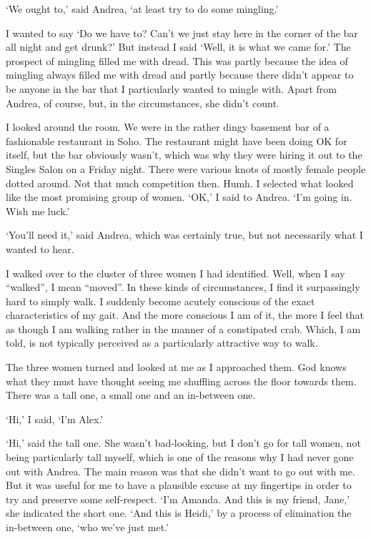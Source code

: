 
\twelverm
`We ought to,' said Andrea, `at least try to do some mingling.'

I wanted to say `Do we have to? Can't we just stay here in the
corner of the bar all night and get drunk?' But instead I said
`Well, it is what we came for.' The prospect of mingling filled me
with dread. This was partly because the idea of mingling always
filled me with dread and partly because there didn't appear to be
anyone in the bar that I particularly wanted to mingle with. Apart
from Andrea, of course, but, in the circumstances, she didn't count.

I looked around the room. We were in the rather dingy basement bar
of a fashionable restaurant in Soho. The restaurant might have been
doing OK for itself, but the bar obviously wasn't, which was why
they were hiring it out to the Singles Salon on a Friday night.
There were various knots of mostly female people dotted around. Not
that much competition then. Humh. I selected what looked like the
most promising group of women. `OK,' I said to Andrea. `I'm going
in. Wish me luck.'

`You'll need it,' said Andrea, which was certainly true, but not
necessarily what I wanted to hear.

I walked over to the cluster of three women I had identified. Well,
when I say ``walked'', I mean ``moved''. In these kinds of
circumstances, I find it surpassingly hard to simply {\twelveit
walk\/}. I suddenly become acutely conscious of the exact
characteristics of my gait. And the more conscious I am of it, the
more I feel that as though I am walking rather in the manner of a
constipated crab. Which, I am told, is not typically perceived as a
particularly attractive way to walk.

The three women turned and looked at me as I approached them. God
knows what they must have thought seeing me shuffling across the
floor towards them. There was a tall one, a small one and an
in-between one.

`Hi,' I said, `I'm Alex.'

`Hi,' said the tall one. She wasn't bad-looking, but I don't go for
tall women, not being particularly tall myself, which is one of the
reasons why I had never gone out with Andrea. The main reason was
that she didn't want to go out with me. But it was useful for me to
have a plausible excuse at my fingertips in order to try and
preserve some self-respect. `I'm Amanda. And this is my friend,
Jane,' she indicated the short one. `And this is Heidi,' by a
process of elimination the in-between one, `who we've just met.'

